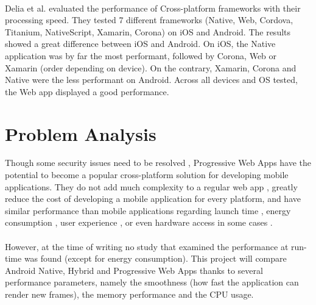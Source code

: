 \documentclass{kththesis}
\begin{document}
\paragraph{}
Delia et al. \cite{delia2017approaches} evaluated the performance of Cross-platform frameworks with their processing speed. They tested 7 different frameworks (Native, Web, Cordova, Titanium, NativeScript, Xamarin, Corona) on iOS and Android. The results showed a great difference between iOS and Android. On iOS, the Native application was by far the most performant, followed by Corona, Web or Xamarin (order depending on device). On the contrary, Xamarin, Corona and Native were the less performant on Android. Across all devices and OS tested, the Web app displayed a good performance. 


\section{Problem Analysis}

Though some security issues need to be resolved \cite{Pride_Prejudice}, Progressive Web Apps have the potential to become a popular cross-platform solution for developing mobile applications. They do not add much complexity to a regular web app \cite{JohannsenFabian2018PWAa}, greatly reduce the cost of developing a mobile application for every platform, and have similar performance than mobile applications regarding launch time \cite{PWApossibleUnifer}\cite{Biorn-Hansen2} \cite{PWAapplicability}, energy consumption \cite{PWAapplicability}, user experience \cite{emulating_native_w_crossplatform}\cite{PWA_UX_comparison_study}, or even hardware access in some cases \cite{PWAbc_responsetime}. 
\paragraph{}

However, at the time of writing no study that examined the performance at run-time was found (except for energy consumption). This project will compare Android Native, Hybrid and Progressive Web Apps thanks to  several performance parameters, namely the smoothness (how fast the application can render new frames), the memory performance and the CPU usage. 
\end{document}
